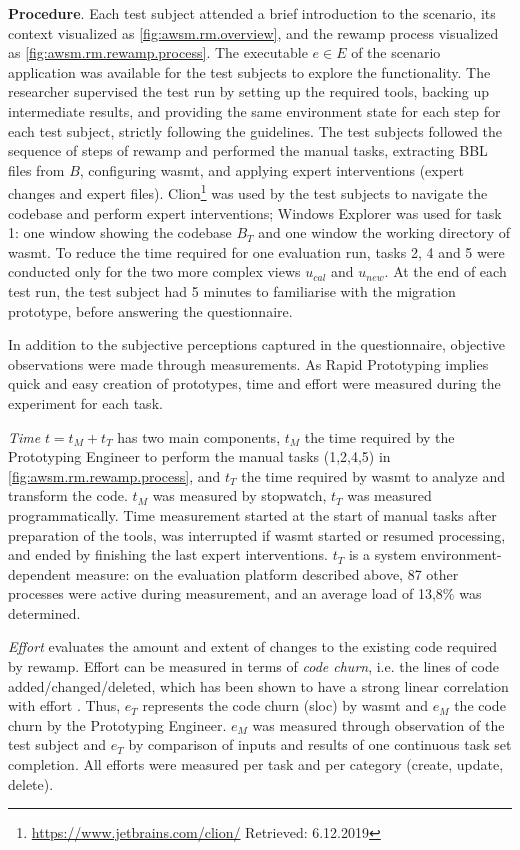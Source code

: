 \textbf{Procedure}.
Each test subject attended a brief introduction to the scenario, its context visualized as \cref{fig:awsm.rm.overview}, and the \gls{rewamp} process visualized as \cref{fig:awsm.rm.rewamp.process}.
The executable \(e \in E\) of the scenario application was available for the test subjects to explore the functionality.
The researcher supervised the test run by setting up the required tools, backing up intermediate results, and providing the same environment state for each step for each test subject, strictly following the guidelines.
The test subjects followed the sequence of steps of \gls{rewamp} and performed the manual tasks, extracting BBL files from \(B\), configuring \gls{wasmt}, and applying expert interventions (expert changes and expert files).
Clion\footnote{\url{https://www.jetbrains.com/clion/} Retrieved: 6.12.2019} was used by the test subjects to navigate the codebase and perform expert interventions; Windows Explorer was used for task 1: one window showing the codebase \(B_T\) and one window the working directory of \gls{wasmt}.
To reduce the time required for one evaluation run, tasks 2, 4 and 5 were conducted only for the two more complex views \(u_{cal}\) and \(u_{new}\).
At the end of each test run, the test subject had 5 minutes to familiarise with the migration prototype, before answering the questionnaire.

In addition to the subjective perceptions captured in the questionnaire, objective observations were made through measurements.
As \gls{Rapid Prototyping} implies quick and easy creation of prototypes, time and effort were measured during the experiment for each task.

\emph{Time} \(t = t_M + t_T\) has two main components, \(t_M\) the time required by the Prototyping Engineer to perform the manual tasks (1,2,4,5) in \cref{fig:awsm.rm.rewamp.process}, and \(t_T\) the time required by \gls{wasmt} to analyze and transform the  code.
\(t_M\) was measured by stopwatch, \(t_T\) was measured programmatically.
Time measurement started at the start of manual tasks after preparation of the tools, was interrupted if \gls{wasmt} started or resumed processing, and ended by finishing the last expert interventions.
\(t_T\) is a system environment-dependent measure: on the evaluation platform described above, 87 other processes were active during measurement, and an average load of 13,8\% was determined.

\emph{Effort} evaluates the amount and extent of changes to the existing  code required by \gls{rewamp}.
Effort can be measured in terms of \emph{code churn}, i.e. the lines of code added/changed/deleted, which has been shown to have a strong linear correlation with effort \autocite{Sjoberg2013}.
Thus, \(e_T\) represents the code churn (\gls{sloc}) by \gls{wasmt} and
\(e_M\) the code churn by the Prototyping Engineer.
\(e_M\) was measured through observation of the test subject and \(e_T\) by comparison of inputs and results of one continuous task set completion.
All efforts were measured per task and per category (create, update, delete).

